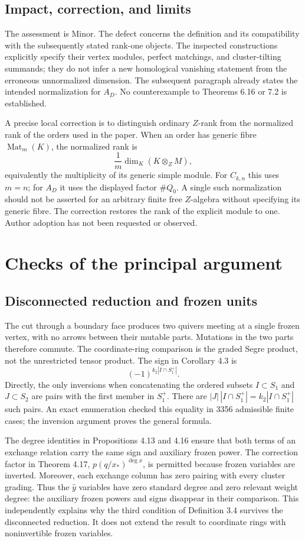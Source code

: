 \documentclass[10pt]{article}
\begin{document}
\subsection*{Impact, correction, and limits}
The assessment is Minor. The defect concerns the definition and its compatibility with the subsequently stated rank-one objects. The inspected constructions explicitly specify their vertex modules, perfect matchings, and cluster-tilting summands; they do not infer a new homological vanishing statement from the erroneous unnormalized dimension. The subsequent paragraph already states the intended normalization for \(A_D\). No counterexample to Theorems 6.16 or 7.2 is established.\par
A precise local correction is to distinguish ordinary \(Z\)-rank from the normalized rank of the orders used in the paper. When an order has generic fibre \(\operatorname{Mat}_m(K)\), the normalized rank is \[\frac{1}{m}\dim_K(K\otimes_ZM),\] equivalently the multiplicity of its generic simple module. For \(C_{k,n}\) this uses \(m=n\); for \(A_D\) it uses the displayed factor \(\#Q_0\). A single such normalization should not be asserted for an arbitrary finite free \(Z\)-algebra without specifying its generic fibre. The correction restores the rank of the explicit module to one. Author adoption has not been requested or observed.\par
\section*{Checks of the principal argument}
\subsection*{Disconnected reduction and frozen units}
The cut through a boundary face produces two quivers meeting at a single frozen vertex, with no arrows between their mutable parts. Mutations in the two parts therefore commute. The coordinate-ring comparison is the graded Segre product, not the unrestricted tensor product. The sign in Corollary 4.3 is \[(-1)^{k_2|I\cap S_1^+|}.\] Directly, the only inversions when concatenating the ordered subsets \(I\subset S_1\) and \(J\subset S_2\) are pairs with the first member in \(S_1^+\). There are \(|J|\,|I\cap S_1^+|=k_2|I\cap S_1^+|\) such pairs. An exact enumeration checked this equality in 3356 admissible finite cases; the inversion argument proves the general formula.\par
The degree identities in Propositions 4.13 and 4.16 ensure that both terms of an exchange relation carry the same sign and auxiliary frozen power. The correction factor in Theorem 4.17, \(p(q/x_*)^{\deg x}\), is permitted because frozen variables are inverted. Moreover, each exchange column has zero pairing with every cluster grading. Thus the \(\widehat y\) variables have zero standard degree and zero relevant weight degree: the auxiliary frozen powers and signs disappear in their comparison. This independently explains why the third condition of Definition 3.4 survives the disconnected reduction. It does not extend the result to coordinate rings with noninvertible frozen variables.\par
\end{document}
